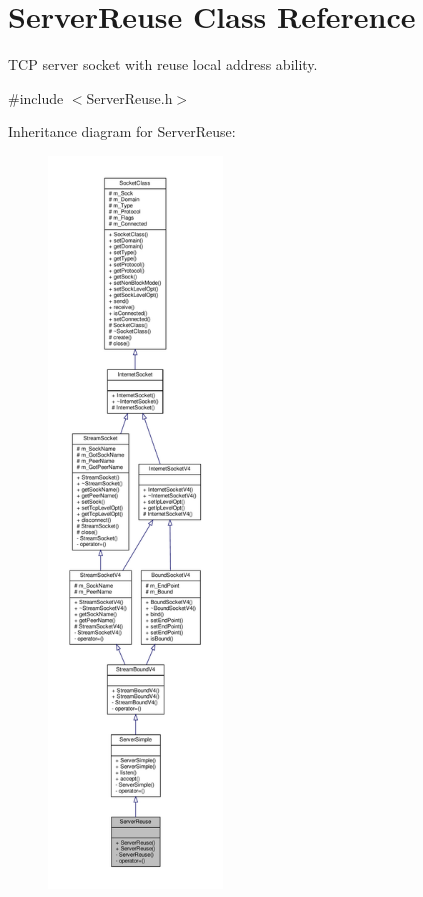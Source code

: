 \hypertarget{classServerReuse}{}\section{Server\+Reuse Class Reference}
\label{classServerReuse}


T\+CP server socket with reuse local address ability.  




{\ttfamily \#include $<$Server\+Reuse.\+h$>$}



Inheritance diagram for Server\+Reuse\+:\nopagebreak
\begin{figure}[H]
\begin{center}
\leavevmode
\includegraphics[height=550pt]{classServerReuse__inherit__graph}
\end{center}
\end{figure}
